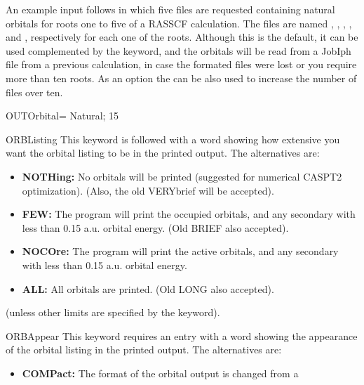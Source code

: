 \begin{keywordlist}
An example input follows in which five files are requested containing
natural orbitals for roots one to five of a RASSCF calculation.
The files are named , , , , and ,
respectively for each one of the roots.
Although this is the default, it can be used complemented by the 
keyword, and the orbitals will be read from
a JobIph file from a previous calculation, in case the formated files
were lost or you require more than ten roots. As an option the
 can be also used to increase the number of files
over ten.
\begin{inputlisting}
OUTOrbital= Natural; 15
\end{inputlisting}
\item[ORBListing]
This keyword is followed with a word showing
how extensive you want the orbital listing to be in the printed output.
The alternatives are:
\begin{itemize}
\item{{\bf NOTHing:}} No orbitals will be printed (suggested for
numerical CASPT2 optimization). (Also, the old VERYbrief will be accepted).
\item{{\bf FEW:}} The program will print the occupied orbitals, and any
secondary with less than 0.15 a.u. orbital energy. (Old BRIEF also accepted).
\item{{\bf NOCOre:}} The program will print the active orbitals, and any
secondary with less than 0.15 a.u. orbital energy.
\item{{\bf ALL:}} All orbitals are printed. (Old LONG also accepted).
\end{itemize}
(unless other limits are specified by the  keyword).
\item[ORBAppear]
This keyword requires an entry with a word showing
the appearance of the orbital listing in the printed output.
The alternatives are:
\begin{itemize}
\item{{\bf COMPact:}} The format of the orbital output is changed from a

\end{itemize}
\end{keywordlist}
